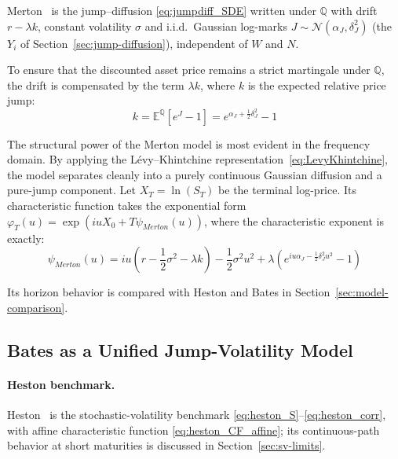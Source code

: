 Merton~\cite{Merton1976} is the jump--diffusion \eqref{eq:jumpdiff_SDE} written under $\mathbb{Q}$ with drift $r-\lambda k$, constant volatility $\sigma$ and i.i.d.\ Gaussian log-marks $J\sim\mathcal{N}(\alpha_J,\delta_J^2)$ (the $Y_i$ of Section~\ref{sec:jump-diffusion}), independent of $W$ and $N$.

To ensure that the discounted asset price remains a strict martingale under $\mathbb{Q}$, the drift is compensated by the term $\lambda k$, where $k$ is the expected relative price jump:
\begin{equation}
    k = \mathbb{E}^{\mathbb{Q}}[e^J - 1] = e^{\alpha_J + \frac{1}{2}\delta_J^2} - 1
\end{equation}

The structural power of the Merton model is most evident in the frequency domain. By applying the L\'evy--Khintchine representation~\eqref{eq:LevyKhintchine}, the model separates cleanly into a purely continuous Gaussian diffusion and a pure-jump component. Let $X_T = \ln(S_T)$ be the terminal log-price. Its characteristic function takes the exponential form $\varphi_T(u) = \exp(i u X_0 + T \psi_{Merton}(u))$, where the characteristic exponent is exactly:
\begin{equation}
    \psi_{Merton}(u) = iu \left( r - \frac{1}{2}\sigma^2 - \lambda k \right) - \frac{1}{2}\sigma^2 u^2 + \lambda \left( e^{iu\alpha_J - \frac{1}{2}\delta_J^2 u^2} - 1 \right)
\end{equation}

Its horizon behavior is compared with Heston and Bates in Section~\ref{sec:model-comparison}.
\subsection{Bates as a Unified Jump-Volatility Model}\label{sec:bates-model}

\paragraph{Heston benchmark.}
Heston~\cite{Heston1993} is the stochastic-volatility benchmark \eqref{eq:heston_S}--\eqref{eq:heston_corr}, with affine characteristic function \eqref{eq:heston_CF_affine}; its continuous-path behavior at short maturities is discussed in Section~\ref{sec:sv-limits}.

